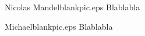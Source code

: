 \documentclass[twocolumn,letterpaper]{IEEEAerospaceCLS}  %
\begin{document}




\thebiography
\begin{biographywithpic}{Nicolas Mandel}{blankpic.eps}
    Blablabla
\end{biographywithpic}

\begin{biographywithpic}{Michael}{blankpic.eps}
    Blablabla
\end{biographywithpic}
\end{document}

